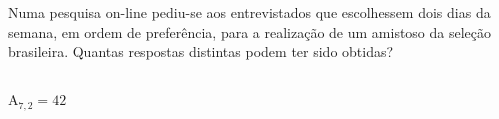\begin{ex}
Numa pesquisa on-line pediu-se aos entrevistados que escolhessem dois dias da semana, em ordem de preferência, para a realização de um amistoso da seleção brasileira. Quantas respostas distintas podem ter sido obtidas?
 \begin{sol}
   \phantom{A} \\
   $\mathrm{A}_{7,2}=42$
 \end{sol}
\end{ex}